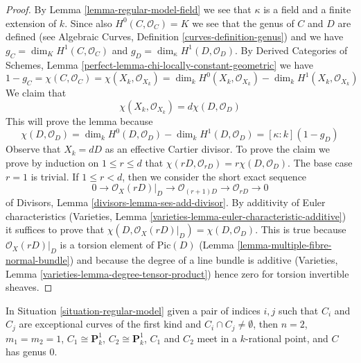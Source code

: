 \begin{proof}
By Lemma \ref{lemma-regular-model-field} we see that $\kappa$ is a field
and a finite extension of $k$. Since also $H^0(C, \mathcal{O}_C) = K$
we see that the genus of $C$ and $D$ are defined (see
Algebraic Curves, Definition \ref{curves-definition-genus}) and
we have $g_C = \dim_K H^1(C, \mathcal{O}_C)$ and
$g_D = \dim_\kappa H^1(D, \mathcal{O}_D)$.
By Derived Categories of Schemes, Lemma
\ref{perfect-lemma-chi-locally-constant-geometric}
we have
$$
1 - g_C = \chi(C, \mathcal{O}_C) =
\chi(X_k, \mathcal{O}_{X_k}) = \dim_k H^0(X_k, \mathcal{O}_{X_k})
- \dim_k H^1(X_k, \mathcal{O}_{X_k})
$$
We claim that
$$
\chi(X_k, \mathcal{O}_{X_k}) = d \chi(D, \mathcal{O}_D)
$$
This will prove the lemma because
$$
\chi(D, \mathcal{O}_D) =
\dim_k H^0(D, \mathcal{O}_D) - \dim_k H^1(D, \mathcal{O}_D) =
[\kappa : k](1 - g_D)
$$
Observe that $X_k = dD$ as an effective Cartier divisor.
To prove the claim we prove by induction on $1 \leq r \leq d$ that
$\chi(rD, \mathcal{O}_{rD}) = r \chi(D, \mathcal{O}_D)$.
The base case $r = 1$ is trivial. If $1 \leq r < d$, then we consider
the short exact sequence
$$
0 \to \mathcal{O}_X(rD)|_D \to \mathcal{O}_{(r + 1)D} \to
\mathcal{O}_{rD} \to 0
$$
of Divisors, Lemma \ref{divisors-lemma-ses-add-divisor}. By additivity
of Euler characteristics
(Varieties, Lemma \ref{varieties-lemma-euler-characteristic-additive})
it suffices to prove that
$\chi(D, \mathcal{O}_X(rD)|_D) = \chi(D, \mathcal{O}_D)$.
This is true because $\mathcal{O}_X(rD)|_D$ is a torsion
element of $\text{Pic}(D)$ (Lemma \ref{lemma-multiple-fibre-normal-bundle})
and because the degree of a line bundle is additive
(Varieties, Lemma \ref{varieties-lemma-degree-tensor-product})
hence zero for torsion invertible sheaves.
\end{proof}

\begin{lemma}
\label{lemma-exceptional-curves-dont-meet}
In Situation \ref{situation-regular-model} given a pair of indices $i, j$
such that $C_i$ and $C_j$ are exceptional curves of the first kind
and $C_i \cap C_j \not = \emptyset$, then
$n = 2$, $m_1 = m_2 = 1$, $C_1 \cong \mathbf{P}^1_k$,
$C_2 \cong \mathbf{P}^1_k$, $C_1$ and $C_2$ meet in a $k$-rational point,
and $C$ has genus $0$.
\end{lemma}


